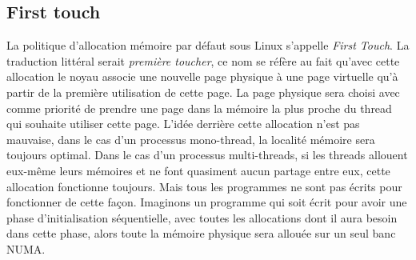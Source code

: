 \subsection{First touch}
La politique d'allocation mémoire par défaut sous Linux s'appelle {\em First Touch}.
%
La traduction littéral serait {\em première toucher}, ce nom se réfère au fait qu'avec cette allocation le noyau associe une nouvelle page physique à une page virtuelle qu'à partir de la première utilisation de cette page.
%
La page physique sera choisi avec comme priorité de prendre une page dans la mémoire la plus proche du thread qui souhaite utiliser cette page.
%
L'idée derrière cette allocation n'est pas mauvaise, dans le cas d'un processus mono-thread, la localité mémoire sera toujours optimal.
%
Dans le cas d'un processus multi-threads, si les threads allouent eux-même leurs mémoires et ne font quasiment aucun partage entre eux, cette allocation fonctionne toujours.
%
Mais tous les programmes ne sont pas écrits pour fonctionner de cette façon.
%
Imaginons un programme qui soit écrit pour avoir une phase d'initialisation séquentielle, avec toutes les allocations dont il aura besoin dans cette phase, alors toute la mémoire physique sera allouée sur un seul banc NUMA.
